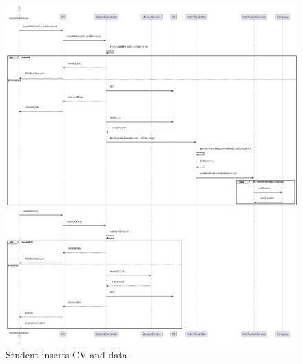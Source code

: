 \newpage

\begin{figure}[ht!]
    \centering
    \includegraphics[scale=0.28]{Images/ImagesSequenceDiagram/StudentUploadCV.png}
    \caption{Student inserts CV and data}
\end{figure}

\newpage

